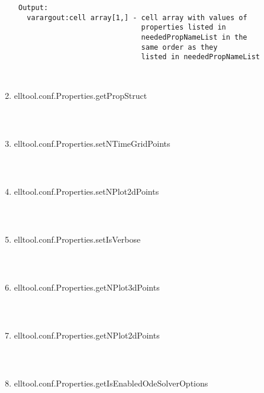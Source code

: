\begin{enumerate}
\begin{lstlisting}
 Output:
   varargout:cell array[1,] - cell array with values of
                              properties listed in
                              neededPropNameList in the
                              same order as they
                              listed in neededPropNameList



\end{lstlisting}
\fontfamily{\familydefault}
\selectfont
\item {elltool.conf.Properties.getPropStruct}
\selectfont
\begin{lstlisting}



\end{lstlisting}
\fontfamily{\familydefault}
\selectfont
\item {elltool.conf.Properties.setNTimeGridPoints}
\selectfont
\begin{lstlisting}



\end{lstlisting}
\fontfamily{\familydefault}
\selectfont
\item {elltool.conf.Properties.setNPlot2dPoints}
\selectfont
\begin{lstlisting}



\end{lstlisting}
\fontfamily{\familydefault}
\selectfont
\item {elltool.conf.Properties.setIsVerbose}
\selectfont
\begin{lstlisting}



\end{lstlisting}
\fontfamily{\familydefault}
\selectfont
\item {elltool.conf.Properties.getNPlot3dPoints}
\selectfont
\begin{lstlisting}



\end{lstlisting}
\fontfamily{\familydefault}
\selectfont
\item {elltool.conf.Properties.getNPlot2dPoints}
\selectfont
\begin{lstlisting}



\end{lstlisting}
\fontfamily{\familydefault}
\selectfont
\item {elltool.conf.Properties.getIsEnabledOdeSolverOptions}
\selectfont
\begin{lstlisting}




\end{lstlisting}
\end{enumerate}
